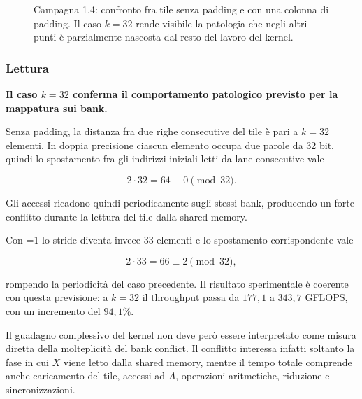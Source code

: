 \begin{figure}[H]
\centering
{}
\caption{Campagna 1.4: confronto fra tile senza padding e con una colonna di
padding. Il caso $k=32$ rende visibile la patologia che negli altri punti è
parzialmente nascosta dal resto del lavoro del kernel.}
\label{fig:ris-pad}
\end{figure}

\subsubsection*{Lettura}

\textbf{Il caso $k=32$ conferma il comportamento patologico previsto per la
mappatura sui bank.}

Senza padding, la distanza fra due righe consecutive del tile è pari a
$k=32$ elementi. In doppia precisione ciascun elemento occupa due parole da
32 bit, quindi lo spostamento fra gli indirizzi iniziali letti da lane
consecutive vale

\[
2\cdot32 = 64 \equiv 0 \pmod{32}.
\]

Gli accessi ricadono quindi periodicamente sugli stessi bank, producendo un
forte conflitto durante la lettura del tile dalla shared memory.

Con =1 lo stride diventa invece $33$ elementi e lo
spostamento corrispondente vale

\[
2\cdot33 = 66 \equiv 2 \pmod{32},
\]

rompendo la periodicità del caso precedente. Il risultato sperimentale è
coerente con questa previsione: a $k=32$ il throughput passa da
$177{,}1$ a $343{,}7$ GFLOPS, con un incremento del $94{,}1\%$.

Il guadagno complessivo del kernel non deve però essere interpretato come
misura diretta della molteplicità del bank conflict. Il conflitto interessa
infatti soltanto la fase in cui $X$ viene letto dalla shared memory, mentre il
tempo totale comprende anche caricamento del tile, accessi ad $A$, operazioni
aritmetiche, riduzione e sincronizzazioni.

